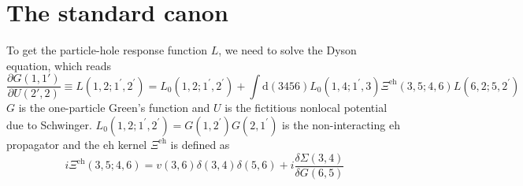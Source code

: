 \section{The standard canon}
To get the particle-hole response function $L$, we need to solve the Dyson equation, which reads
\begin{equation}
    \frac{\partial G(1,1')}{\partial U(2',2)}\equiv L\left(1,2 ; 1^{\prime} ,2^{\prime}\right)=L_0\left(1,2 ; 1^{\prime}, 2^{\prime}\right) +\int \mathrm{d}\left(3456\right) L_0\left(1,4 ; 1^{\prime}, 3\right) \Xi^{\mathrm{eh}}\left(3,5 ; 4 ,6\right) L\left(6, 2 ; 5,2^{\prime}\right)
\end{equation}
$G$ is the one-particle Green's function and $U$ is the fictitious nonlocal potential due to Schwinger. $L_0\left(1,2 ; 1^{\prime} ,2^{\prime}\right)=G\left(1,2^{\prime}\right) G\left(2,1^{\prime}\right)$ is the non-interacting eh propagator and the eh kernel $\Xi^{\mathrm{eh}}$ is defined as
\begin{equation}
    i\Xi^{\mathrm{eh}}\left(3,5 ; 4,6\right)=v(3,6)\delta (3,4)\delta (5,6)+i\frac{\delta \Sigma\left(3,4\right)}{\delta G\left(6,5\right)}
\end{equation}
